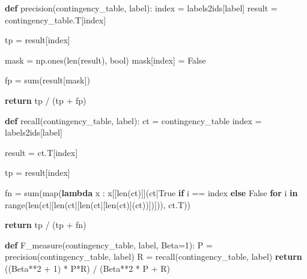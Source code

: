 \documentclass[
  11pt,
  british,
]{article}
\newenvironment{Shaded}{}{}
\newcommand{\BuiltInTok}[1]{#1}
\newcommand{\ControlFlowTok}[1]{\textcolor[rgb]{0.00,0.44,0.13}{\textbf{#1}}}
\newcommand{\DecValTok}[1]{\textcolor[rgb]{0.25,0.63,0.44}{#1}}
\newcommand{\KeywordTok}[1]{\textcolor[rgb]{0.00,0.44,0.13}{\textbf{#1}}}
\newcommand{\NormalTok}[1]{#1}
\newcommand{\OperatorTok}[1]{\textcolor[rgb]{0.40,0.40,0.40}{#1}}
\newcommand{\VariableTok}[1]{\textcolor[rgb]{0.10,0.09,0.49}{#1}}
\begin{document}
\begin{Shaded}
\begin{Highlighting}[]
\KeywordTok{def}\NormalTok{ precision(contingency\_table, label):}
\NormalTok{    index }\OperatorTok{=}\NormalTok{ labels2ids[label]}
\NormalTok{    result }\OperatorTok{=}\NormalTok{ contingency\_table.T[index]}
    
\NormalTok{    tp }\OperatorTok{=}\NormalTok{ result[index]}
    
\NormalTok{    mask }\OperatorTok{=}\NormalTok{ np.ones(}\BuiltInTok{len}\NormalTok{(result), }\BuiltInTok{bool}\NormalTok{)}
\NormalTok{    mask[index] }\OperatorTok{=} \VariableTok{False}
    
\NormalTok{    fp }\OperatorTok{=} \BuiltInTok{sum}\NormalTok{(result[mask])}
    
    \ControlFlowTok{return}\NormalTok{ tp }\OperatorTok{/}\NormalTok{ (tp }\OperatorTok{+}\NormalTok{ fp)}


\KeywordTok{def}\NormalTok{ recall(contingency\_table, label):}
\NormalTok{    ct }\OperatorTok{=}\NormalTok{ contingency\_table}
\NormalTok{    index }\OperatorTok{=}\NormalTok{ labels2ids[label]}
    
\NormalTok{    result }\OperatorTok{=}\NormalTok{ ct.T[index]}
    
\NormalTok{    tp }\OperatorTok{=}\NormalTok{ result[index]}
    
\NormalTok{    fn }\OperatorTok{=} \BuiltInTok{sum}\NormalTok{(}\BuiltInTok{map}\NormalTok{(}\KeywordTok{lambda}\NormalTok{ x : x[[}\BuiltInTok{len}\NormalTok{(ct)]](ct}\OperatorTok{|}\VariableTok{True} \ControlFlowTok{if}\NormalTok{ i }\OperatorTok{==}\NormalTok{ index }\ControlFlowTok{else} \VariableTok{False} \ControlFlowTok{for}\NormalTok{ i }\KeywordTok{in} \BuiltInTok{range}\NormalTok{(}\BuiltInTok{len}\NormalTok{(ct}\OperatorTok{|}\NormalTok{[}\BuiltInTok{len}\NormalTok{(ct}\OperatorTok{|}\NormalTok{[}\BuiltInTok{len}\NormalTok{(ct}\OperatorTok{|}\NormalTok{[}\BuiltInTok{len}\NormalTok{(ct)](ct))])])), ct.T))}
    
    \ControlFlowTok{return}\NormalTok{ tp }\OperatorTok{/}\NormalTok{ (tp }\OperatorTok{+}\NormalTok{ fn)}
    


\KeywordTok{def}\NormalTok{ F\_measure(contingency\_table, label, Beta}\OperatorTok{=}\DecValTok{1}\NormalTok{):}
\NormalTok{    P }\OperatorTok{=}\NormalTok{ precision(contingency\_table, label)}
\NormalTok{    R }\OperatorTok{=}\NormalTok{ recall(contingency\_table, label)}
    \ControlFlowTok{return}\NormalTok{ ((Beta}\OperatorTok{**}\DecValTok{2} \OperatorTok{+} \DecValTok{1}\NormalTok{) }\OperatorTok{*}\NormalTok{ P}\OperatorTok{*}\NormalTok{R) }\OperatorTok{/}\NormalTok{ (Beta}\OperatorTok{**}\DecValTok{2} \OperatorTok{*}\NormalTok{ P }\OperatorTok{+}\NormalTok{ R)}
\end{Highlighting}
\end{Shaded}
\end{document}
